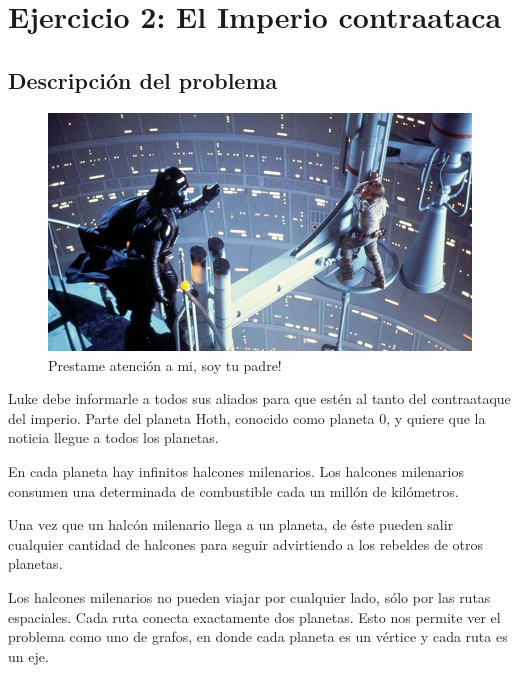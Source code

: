 \section{Ejercicio 2: El Imperio contraataca}

    \subsection{Descripción del problema}

    \begin{figure}[ht]
        \begin{center}
            \includegraphics[width=1\columnwidth]{imagenes/el_imperio_contraataca.jpg}
            \caption{Prestame atención a mi, soy tu padre!}
        \end{center}
    \end{figure}

    Luke debe informarle a todos sus aliados para que estén al tanto del contraataque del imperio. Parte del planeta Hoth, conocido como planeta 0, y quiere que la noticia llegue a todos los planetas.

    En cada planeta hay infinitos halcones milenarios. Los halcones milenarios consumen una determinada de combustible cada un millón de kilómetros.

    Una vez que un halcón milenario llega a un planeta, de éste pueden salir cualquier cantidad de halcones para seguir advirtiendo a los rebeldes de otros planetas.

    Los halcones milenarios no pueden viajar por cualquier lado, sólo por las rutas espaciales. Cada ruta conecta exactamente dos planetas. Esto nos permite ver el problema como uno de grafos, en donde cada planeta es un vértice y cada ruta es un eje.

